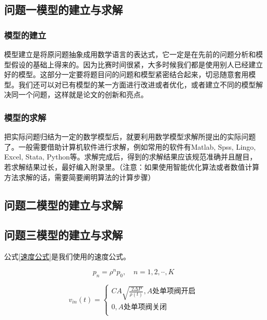 \documentclass{my_paper}
\begin{document}
\subsection{问题一模型的建立与求解}
\subsubsection{模型的建立}
模型建立是将原问题抽象成用数学语言的表达式，它一定是在先前的问题分析和模型假设的基础上得来的。因为比赛时间很紧，大多时候我们都是使用别人已经建立好的模型。这部分一定要将题目问的问题和模型紧密结合起来，切忌随意套用模型。我们还可以对已有模型的某一方面进行改进或者优化，或者建立不同的模型解决同一个问题，这样就是论文的创新和亮点。
\subsubsection{模型的求解}
把实际问题归结为一定的数学模型后，就要利用数学模型求解所提出的实际问题了。一般需要借助计算机软件进行求解，例如常用的软件有Matlab, Spss, Lingo, Excel, Stata, Python等。求解完成后，得到的求解结果应该规范准确并且醒目，若求解结果过长，最好编入附录里。（注意：如果使用智能优化算法或者数值计算方法求解的话，需要简要阐明算法的计算步骤）
\subsection{问题二模型的建立与求解}

\subsection{问题三模型的建立与求解}

公式\eqref{速度公式}是我们使用的速度公式。

\begin{equation}
p_{n}=\rho^{n}p_{0},\quad n=1,2,\cdot\cdot,K
\label{速度公式}
\end{equation}

\begin{equation}
v_{in}\left( t \right) =\begin{cases}
 CA\sqrt{\frac{2\varDelta P}{\rho \left( t \right)}},A\text{处单项阀开启}\\
 0,             A\text{处单项阀关闭}\\
\end{cases}
\end{equation}



\end{document}
